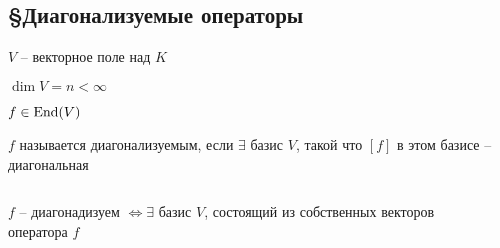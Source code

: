     \subsection*{\S Диагонализуемые операторы}

    \par $V$ -- векторное поле над $K$
    \par $\dim V = n < \infty$
    \par $f \in \operatorname{End}(V)$

    \begin{definition}
        $f$ называется диагонализуемым, если $\exists$ базис $V$, такой что $[f]$ в этом базисе -- диагональная
    \end{definition}

    \begin{theorem*}
        $ $
        \par $f$ -- диагонадизуем $\Leftrightarrow \exists$ базис $V$, состоящий из собственных векторов \\ оператора $f$
    \end{theorem*}

